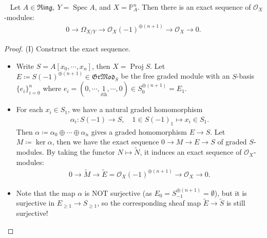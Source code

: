 \documentclass[11pt,a4paper,footinclude=true,headinclude=true]{scrbook} %
\DeclareMathOperator{\Spec}{Spec}
\DeclareMathOperator{\Proj}{Proj}
\newcommand{\OO}{\mathcal{O}}
\newcommand{\PP}{\mathbb{P}}
\newcommand{\Ring}{\mathfrak{Ring}}
\newcommand{\<}{\langle}
\newcommand{\>}{\rangle}
\newcommand{\GR}{\mathfrak{Gr}}
\newcommand{\MOD}{\mathfrak{Mod}}
\newenvironment{theorem}[2][]
{\renewcommand\theinnercustomthm{#2}\innercustomthm[#1]
\begin{mdframed}[backgroundcolor=yellow!20]\ }
{\end{mdframed}\endinnercustomthm}
\begin{document}
\begin{theorem}{8.13}
    Let $A\in\Ring,\ Y=\Spec A$, and $X=\PP_A^n$. Then there is an exact sequence of $\OO_X$-modules:
    \begin{align*}
        0\longrightarrow\Omega_{X/Y}\longrightarrow\OO_X(-1)^{\oplus(n+1)}\longrightarrow\OO_X\longrightarrow0.
    \end{align*}
\end{theorem}
\begin{proof}
    (I) Construct the exact sequence.
    \begin{itemize}
        \item Write $S=A[x_0,\cdots,x_n]$, then $X=\Proj S$. Let $E\coloneqq S(-1)^{\oplus(n+1)}\in \GR\MOD_S$ be the free graded module with an $S$-basis $\{e_i\}_{i=0}^n$ where $e_i=(0,\cdots,\underset{i\text{th}}{1},\cdots,0)\in S_0^{\oplus(n+1)}=E_1$. 
        \item For each $x_i\in S_1$, we have a natural graded homomorphism 
        \begin{align*}
            \alpha_i:S(-1)\longrightarrow S,\quad1\in S(-1)_1\longmapsto x_i\in S_1.
        \end{align*}
        Then $\alpha\coloneqq\alpha_0\oplus\cdots\oplus\alpha_n$ gives a graded homomorphism $E\to S$. Let $M\coloneqq\ker\alpha$, then we have the exact sequence $0\to M\to E\to S$ of graded $S$-modules. By taking the functor $N\mapsto\widetilde{N}$, it induces an exact sequence of $\OO_X$-modules:
        \begin{align*}
            0\longrightarrow\widetilde{M}\longrightarrow\widetilde{E}=\OO_X(-1)^{\oplus(n+1)}\longrightarrow\OO_X\longrightarrow0.
        \end{align*}
        \item Note that the map $\alpha$ is NOT surjective (as $E_0=S_{-1}^{\oplus(n+1)}=\emptyset$), but it is surjective in $E_{\geq1}\to S_{\geq1}$, so the corresponding sheaf map $\widetilde{E}\to\widetilde{S}$ is still surjective!
    \end{itemize}
    

\end{proof}
\end{document}
